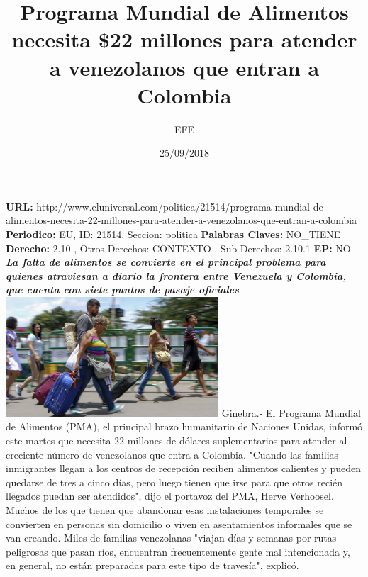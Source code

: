 \documentclass{article}%
\title{\textbf{Programa Mundial de Alimentos necesita \$22 millones para atender a venezolanos que entran a Colombia}}%
\author{EFE}%
\date{25/09/2018}%
\begin{document}
%
\normalsize%
\maketitle%
\textbf{URL: }%
http://www.eluniversal.com/politica/21514/programa{-}mundial{-}de{-}alimentos{-}necesita{-}22{-}millones{-}para{-}atender{-}a{-}venezolanos{-}que{-}entran{-}a{-}colombia\newline%
%
\textbf{Periodico: }%
EU, %
ID: %
21514, %
Seccion: %
politica\newline%
%
\textbf{Palabras Claves: }%
NO\_TIENE\newline%
%
\textbf{Derecho: }%
2.10%
, Otros Derechos: %
CONTEXTO%
, Sub Derechos: %
2.10.1%
\newline%
%
\textbf{EP: }%
NO\newline%
\newline%
%
\textbf{\textit{La falta de alimentos se convierte en el principal problema para quienes atraviesan a diario la frontera entre Venezuela y Colombia, que cuenta con siete puntos de pasaje oficiales}}%
\newline%
\newline%
%
\includegraphics[width=300px]{251.jpg}%
\newline%
%
Ginebra.{-} El Programa Mundial de Alimentos (PMA), el principal brazo humanitario de Naciones Unidas, informó este martes que necesita 22 millones de dólares suplementarios para atender al creciente número de venezolanos que entra a Colombia.%
\newline%
%
"Cuando las familias inmigrantes llegan a los centros de recepción reciben alimentos calientes y pueden quedarse de tres a cinco días, pero luego tienen que irse para que otros recién llegados puedan ser atendidos", dijo el portavoz del PMA, Herve Verhoosel.%
\newline%
%
Muchos de los que tienen que abandonar esas instalaciones temporales se convierten en personas sin domicilio o viven en asentamientos informales que se van creando.%
\newline%
%
Miles de familias venezolanas "viajan días y semanas por rutas peligrosas que pasan ríos, encuentran frecuentemente gente mal intencionada y, en general, no están preparadas para este tipo de travesía", explicó.%
\end{document}
